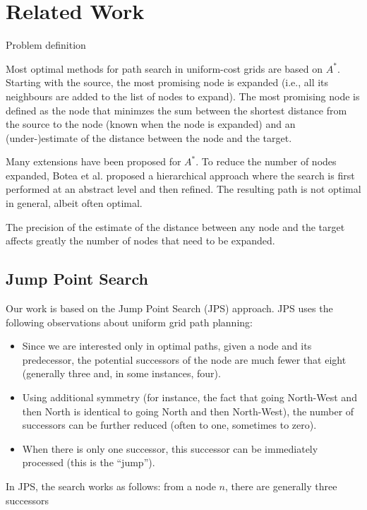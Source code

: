 \section{Related Work}

Problem definition

Most optimal methods for path search in uniform-cost grids are based on $A^*$.  
Starting with the source, 
the most promising node is expanded 
(i.e., all its neighbours are added to the list of nodes to expand).  
The most promising node is defined as the node 
that minimzes the sum 
between the shortest distance from the source to the node 
(known when the node is expanded) 
and an (under-)estimate of the distance between the node and the target.  

Many extensions have been proposed for $A^*$.  
To reduce the number of nodes expanded, 
Botea et al. \cite{botea04} proposed a hierarchical approach
where the search is first performed at an abstract level 
and then refined.  
The resulting path is not optimal in general, 
albeit often optimal.  

The precision of the estimate of the distance 
between any node and the target 
affects greatly the number of nodes that need to be expanded.  


\subsection{Jump Point Search}

Our work is based on the Jump Point Search (JPS) approach.  
JPS uses the following observations about uniform grid path planning: 
\begin{itemize}
\item 
  Since we are interested only in optimal paths, 
  given a node and its predecessor, 
  the potential successors of the node are much fewer 
  that eight (generally three and, in some instances, four).  
\item 
  Using additional symmetry (for instance, the fact that going North-West 
  and then North is identical to going North and then North-West), 
  the number of successors can be further reduced (often to one, sometimes to zero).  
\item 
  When there is only one successor, 
  this successor can be immediately processed (this is the ``jump'').  
\end{itemize}

In JPS, the search works as follows: 
from a node $n$, there are generally three successors

